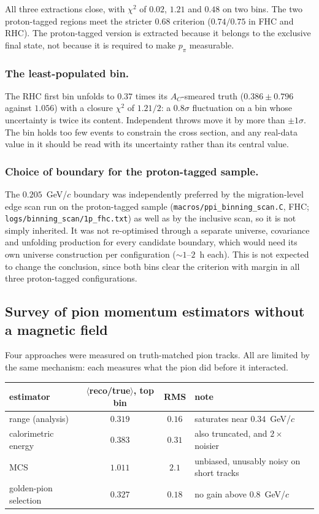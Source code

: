 \documentclass[11pt,a4paper]{article}
\begin{document}
All three extractions close, with $\chi^2$ of $0.02$, $1.21$ and $0.48$ on two bins.
The two proton-tagged regions meet the stricter $0.68$ criterion ($0.74/0.75$ in
FHC and RHC). The proton-tagged version is extracted because it belongs to the exclusive
final state, not because it is required to make $p_\pi$ measurable.

\subsubsection{The least-populated bin.} The RHC first bin unfolds to $0.37$ times its
$A_C$-smeared truth ($0.386\pm0.796$ against $1.056$) with a closure
$\chi^2$ of $1.21/2$: a $0.8\sigma$ fluctuation on a bin whose uncertainty is twice its
content. Independent throws move it by more than $\pm1\sigma$. The bin holds too few
events to constrain the cross section, and any real-data value in it should be read with its
uncertainty rather than its central value.

\subsubsection{Choice of boundary for the proton-tagged sample.} The $0.205$~GeV/$c$
boundary was independently preferred
by the migration-level edge scan run on the proton-tagged sample
(\texttt{macros/ppi\_binning\_scan.C}, FHC; \texttt{logs/binning\_scan/1p\_fhc.txt}) as
well as by the inclusive scan, so it is not simply inherited. It was not
re-optimised through a separate universe, covariance and unfolding production for every
candidate boundary, which would need its own universe construction per configuration
($\sim\!1$--$2$~h each). This is not expected to change the conclusion, since both bins
clear the criterion with margin in all three proton-tagged configurations.



\subsection{Survey of pion momentum estimators without a magnetic field}
\label{sec:ppi_estimators}

Four approaches were measured on truth-matched pion tracks. All are limited by the same
mechanism: each measures what the pion did before it interacted.

\begin{center}\small
\begin{tabular}{lccl}
\toprule
estimator & $\langle$reco/true$\rangle$, top bin & RMS & note \\\midrule
range (analysis)      & $0.319$ & $0.16$ & saturates near $0.34$~GeV/$c$ \\
calorimetric energy   & $0.383$ & $0.31$ & also truncated, and $2\times$ noisier \\
MCS                   & $1.011$ & $2.1$  & unbiased, unusably noisy on short tracks \\
golden-pion selection & $0.327$ & $0.18$ & no gain above $0.8$~GeV/$c$ \\
\bottomrule
\end{tabular}
\end{center}
\end{document}
